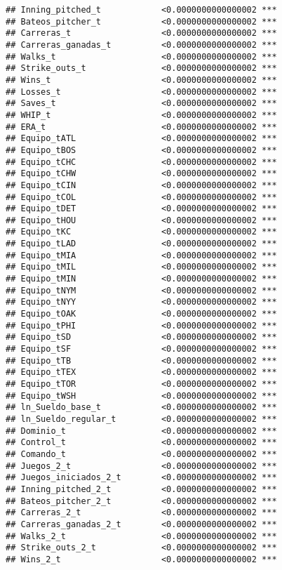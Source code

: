 \documentclass[
]{article}
\begin{document}
\begin{verbatim}
## Inning_pitched_t            <0.0000000000000002 ***
## Bateos_pitcher_t            <0.0000000000000002 ***
## Carreras_t                  <0.0000000000000002 ***
## Carreras_ganadas_t          <0.0000000000000002 ***
## Walks_t                     <0.0000000000000002 ***
## Strike_outs_t               <0.0000000000000002 ***
## Wins_t                      <0.0000000000000002 ***
## Losses_t                    <0.0000000000000002 ***
## Saves_t                     <0.0000000000000002 ***
## WHIP_t                      <0.0000000000000002 ***
## ERA_t                       <0.0000000000000002 ***
## Equipo_tATL                 <0.0000000000000002 ***
## Equipo_tBOS                 <0.0000000000000002 ***
## Equipo_tCHC                 <0.0000000000000002 ***
## Equipo_tCHW                 <0.0000000000000002 ***
## Equipo_tCIN                 <0.0000000000000002 ***
## Equipo_tCOL                 <0.0000000000000002 ***
## Equipo_tDET                 <0.0000000000000002 ***
## Equipo_tHOU                 <0.0000000000000002 ***
## Equipo_tKC                  <0.0000000000000002 ***
## Equipo_tLAD                 <0.0000000000000002 ***
## Equipo_tMIA                 <0.0000000000000002 ***
## Equipo_tMIL                 <0.0000000000000002 ***
## Equipo_tMIN                 <0.0000000000000002 ***
## Equipo_tNYM                 <0.0000000000000002 ***
## Equipo_tNYY                 <0.0000000000000002 ***
## Equipo_tOAK                 <0.0000000000000002 ***
## Equipo_tPHI                 <0.0000000000000002 ***
## Equipo_tSD                  <0.0000000000000002 ***
## Equipo_tSF                  <0.0000000000000002 ***
## Equipo_tTB                  <0.0000000000000002 ***
## Equipo_tTEX                 <0.0000000000000002 ***
## Equipo_tTOR                 <0.0000000000000002 ***
## Equipo_tWSH                 <0.0000000000000002 ***
## ln_Sueldo_base_t            <0.0000000000000002 ***
## ln_Sueldo_regular_t         <0.0000000000000002 ***
## Dominio_t                   <0.0000000000000002 ***
## Control_t                   <0.0000000000000002 ***
## Comando_t                   <0.0000000000000002 ***
## Juegos_2_t                  <0.0000000000000002 ***
## Juegos_iniciados_2_t        <0.0000000000000002 ***
## Inning_pitched_2_t          <0.0000000000000002 ***
## Bateos_pitcher_2_t          <0.0000000000000002 ***
## Carreras_2_t                <0.0000000000000002 ***
## Carreras_ganadas_2_t        <0.0000000000000002 ***
## Walks_2_t                   <0.0000000000000002 ***
## Strike_outs_2_t             <0.0000000000000002 ***
## Wins_2_t                    <0.0000000000000002 ***

\end{verbatim}
\end{document}
